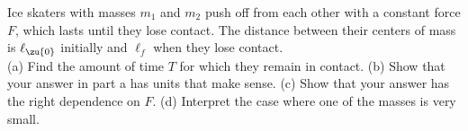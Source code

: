 Ice skaters with masses $m_1$ and $m_2$ push off from each other with a constant
  force $F$, which lasts until they lose contact. The distance between their centers of mass is 
  $\ell_\zu{0}$ initially and $\ell_f$ when they lose contact.\\
%
(a) Find the amount of time $T$  for which they remain in contact.\hwendpart
(b) Show that your answer in part a has units that make sense.\hwendpart
(c) Show that your answer has the right dependence on $F$.\hwendpart
(d) Interpret the case where one of the masses is very small.\hwendpart
